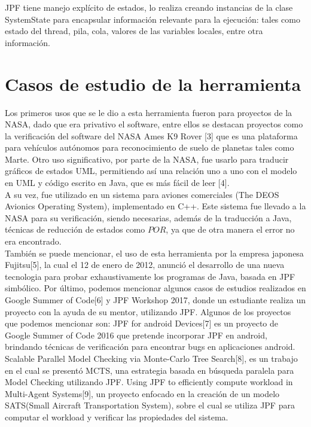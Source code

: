 \documentclass[runningheads]{llncs}
\begin{document}
JPF tiene manejo expl\'icito de estados, lo realiza creando instancias de la clase SystemState para encapsular informaci\'on relevante para la ejecuci\'on: tales como estado del thread, pila, cola, valores de las variables locales, entre otra informaci\'on.


\section{Casos de estudio de la herramienta}

Los primeros usos que se le dio a esta herramienta fueron para proyectos de la NASA, dado que era privativo el software, entre ellos se destacan proyectos como la verificaci\'on del software del NASA Ames K9 Rover [3] que es una plataforma para veh\'iculos aut\'onomos para reconocimiento de suelo de planetas tales como Marte.
Otro uso significativo, por parte de la NASA, fue usarlo para traducir gr\'aficos de estados UML, permitiendo as\'i una relaci\'on uno a uno con el modelo en UML y c\'odigo escrito en Java, que es m\'as f\'acil de leer [4].\\
A su vez, fue utilizado en un sistema para aviones comerciales (The DEOS Avionics Operating System), implementado en C++. Este sistema fue llevado a la NASA para su verificaci\'on, siendo necesarias, adem\'as de la traducci\'on a Java, t\'ecnicas de reducci\'on de estados como $POR$, ya que de otra manera el error no era encontrado.\\
Tambi\'en se puede mencionar, el uso de esta herramienta por la empresa japonesa Fujitsu[5], la cual el 12 de enero de 2012, anunci\'o el desarrollo de una nueva tecnologia para probar exhaustivamente los programas de Java, basada en JPF simb\'olico.
Por \'ultimo, podemos mencionar algunos casos de estudios realizados en Google Summer of Code[6] y JPF Workshop 2017, donde un estudiante realiza un proyecto con la ayuda de su mentor, utilizando JPF. Algunos de los proyectos que podemos mencionar son: 
JPF for android Devices[7] es un proyecto de Google Summer of Code 2016 que pretende incorporar JPF en android, brindando t\'ecnicas de verificaci\'on para encontrar bugs en aplicaciones android.\\
Scalable Parallel Model Checking via Monte-Carlo Tree Search[8], es un trabajo en el cual se present\'o MCTS, una estrategia basada en b\'usqueda paralela para Model Checking utilizando JPF.
Using JPF to efficiently compute workload in Multi-Agent Systems[9], un proyecto enfocado en la creaci\'on de un modelo SATS(Small Aircraft Transportation System), sobre el cual se utiliza JPF para computar el workload y verificar las propiedades del sistema.
\end{document}
